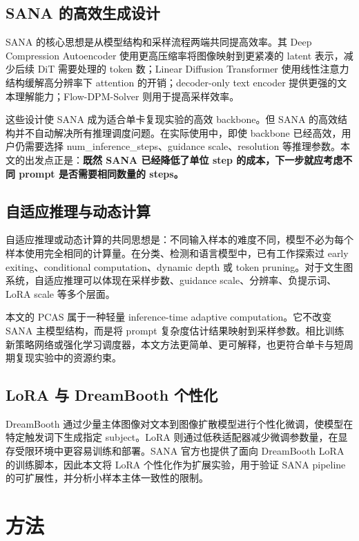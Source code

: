 \documentclass[UTF8,zihao=-4,fontset=fandol]{ctexart}
\begin{document}
\subsection{SANA 的高效生成设计}

SANA 的核心思想是从模型结构和采样流程两端共同提高效率。其 Deep Compression Autoencoder 使用更高压缩率将图像映射到更紧凑的 latent 表示，减少后续 DiT 需要处理的 token 数；Linear Diffusion Transformer 使用线性注意力结构缓解高分辨率下 attention 的开销；decoder-only text encoder 提供更强的文本理解能力；Flow-DPM-Solver 则用于提高采样效率。

这些设计使 SANA 成为适合单卡复现实验的高效 backbone。但 SANA 的高效结构并不自动解决所有推理调度问题。在实际使用中，即使 backbone 已经高效，用户仍需要选择 num\_inference\_steps、guidance scale、resolution 等推理参数。本文的出发点正是：\textbf{既然 SANA 已经降低了单位 step 的成本，下一步就应考虑不同 prompt 是否需要相同数量的 steps。}

\subsection{自适应推理与动态计算}

自适应推理或动态计算的共同思想是：不同输入样本的难度不同，模型不必为每个样本使用完全相同的计算量。在分类、检测和语言模型中，已有工作探索过 early exiting、conditional computation、dynamic depth 或 token pruning。对于文生图系统，自适应推理可以体现在采样步数、guidance scale、分辨率、负提示词、LoRA scale 等多个层面。

本文的 PCAS 属于一种轻量 inference-time adaptive computation。它不改变 SANA 主模型结构，而是将 prompt 复杂度估计结果映射到采样参数。相比训练新策略网络或强化学习调度器，本文方法更简单、更可解释，也更符合单卡与短周期复现实验中的资源约束。

\subsection{LoRA 与 DreamBooth 个性化}

DreamBooth 通过少量主体图像对文本到图像扩散模型进行个性化微调，使模型在特定触发词下生成指定 subject。LoRA 则通过低秩适配器减少微调参数量，在显存受限环境中更容易训练和部署。SANA 官方也提供了面向 DreamBooth LoRA 的训练脚本，因此本文将 LoRA 个性化作为扩展实验，用于验证 SANA pipeline 的可扩展性，并分析小样本主体一致性的限制。

\section{方法}
\end{document}
